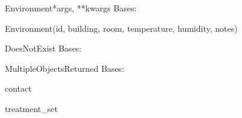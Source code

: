 \documentclass[letterpaper,10pt,english]{sphinxmanual}
\begin{document}
\hypertarget{data.models.Environment}{}\begin{classdesc}{Environment}{*args, **kwargs}
Bases: 

Environment(id, building, room, temperature, humidity, notes)

\hypertarget{data.models.Environment.DoesNotExist}{}\begin{excdesc}{DoesNotExist}
Bases: 
\end{excdesc}

\hypertarget{data.models.Environment.MultipleObjectsReturned}{}\begin{excdesc}{MultipleObjectsReturned}
Bases: 
\end{excdesc}

\hypertarget{data.models.Environment.contact}{}\begin{memberdesc}[Environment]{contact}\end{memberdesc}

\hypertarget{data.models.Environment.treatment\_set}{}\begin{memberdesc}[Environment]{treatment\_set}\end{memberdesc}
\end{classdesc}
\end{document}
